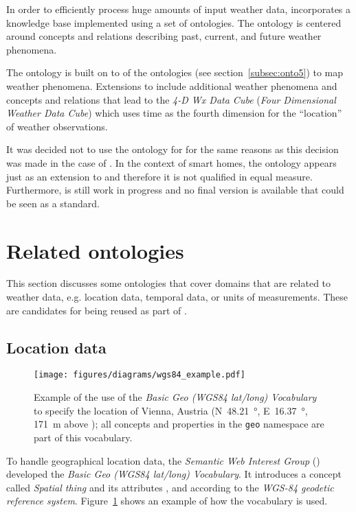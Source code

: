 In order to efficiently process huge amounts of input weather data,  incorporates a knowledge base implemented using a set of ontologies. The  ontology is centered around concepts and relations describing past, current, and future weather phenomena.

The  ontology is built on to of the  ontologies (see section~\ref{subsec:onto5}) to map weather phenomena. Extensions to  include additional weather phenomena and concepts and relations that lead to the \emph{4-D Wx Data Cube} (\emph{Four Dimensional Weather Data Cube}) which uses time as the fourth dimension for the ``location'' of weather observations.

It was decided not to use the  ontology for \smarthomeweather for the same reasons as this decision was made in the case of . In the context of smart homes, the  ontology appears just as an extension to  and therefore it is not qualified in equal measure. Furthermore,  is still work in progress and no final version is available that could be seen as a standard.

\section{Related ontologies}
\label{sec:related_ontologies}

This section discusses some ontologies that cover domains that are related to weather data, e.g. location data, temporal data, or units of measurements. These are candidates for being reused as part of \smarthomeweather.

\subsection{Location data}
\label{subsec:location_ontologies}

\begin{figure}
\centering
\texttt{[image: figures/diagrams/wgs84\_example.pdf]}
\caption{Example of the use of the \emph{Basic Geo (WGS84 lat/long) Vocabulary} to specify the location of Vienna, Austria (N~\SI{48.21}{\degree}, E~\SI{16.37}{\degree}, \SI{171}{\metre} above ); all concepts and properties in the \texttt{geo} namespace are part of this vocabulary.}
\label{fig:wgs84_example}
\end{figure}

To handle geographical location data, the \emph{ Semantic Web Interest Group} () developed the \emph{Basic Geo (WGS84 lat/long) Vocabulary}\cite{wgs84_vocabulary}. It introduces a concept called \emph{Spatial thing} and its attributes ,  and  according to the \emph{WGS-84 geodetic reference system}\cite{WGS84}. Figure~\ref{fig:wgs84_example} shows an example of how the vocabulary is used.

